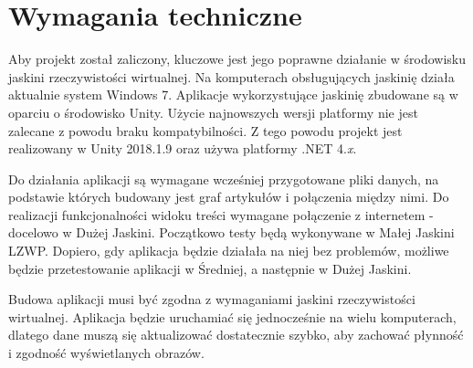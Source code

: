 \section{Wymagania techniczne}
Aby projekt został zaliczony, kluczowe jest jego poprawne działanie w środowisku jaskini rzeczywistości wirtualnej. Na komputerach obsługujących jaskinię działa aktualnie system Windows 7. Aplikacje wykorzystujące jaskinię zbudowane są w oparciu o środowisko Unity. Użycie najnowszych wersji platformy nie jest zalecane z powodu braku kompatybilności. Z tego powodu projekt jest realizowany w Unity 2018.1.9 oraz używa platformy .NET 4.\textit{x}.

Do działania aplikacji są wymagane wcześniej przygotowane pliki danych, na podstawie których budowany jest graf artykułów i połączenia między nimi. Do realizacji funkcjonalności widoku treści wymagane połączenie z internetem - docelowo w Dużej Jaskini. Początkowo testy będą wykonywane w Małej Jaskini LZWP. Dopiero, gdy aplikacja będzie działała na niej bez problemów, możliwe będzie przetestowanie aplikacji w Średniej, a następnie w Dużej Jaskini.

Budowa aplikacji musi być zgodna z wymaganiami jaskini rzeczywistości wirtualnej. Aplikacja będzie uruchamiać się jednocześnie na wielu komputerach, dlatego dane muszą się aktualizować dostatecznie szybko, aby zachować płynność i zgodność wyświetlanych obrazów.
\newpage